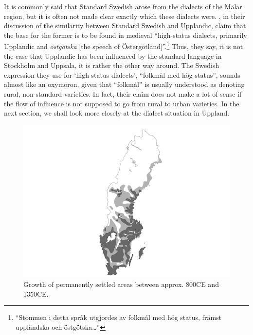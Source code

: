 It is commonly said that Standard Swedish arose from the dialects of the Mälar region, but it is often not made clear exactly which these dialects were. \citet[67]{KällskogEtAl1993}, in their discussion of the similarity between Standard Swedish and Upplandic, claim that the base for the former is to be found in medieval “high-status dialects, primarily Upplandic and \textit{östgötska} [the speech of Östergötland]”.\footnote{ “Stommen i detta språk utgjordes av folkmål med hög status, främst uppländska och östgötska…”} Thus, they say, it is not the case that Upplandic has been influenced by the standard language in Stockholm and Uppsala, it is rather the other way around. The Swedish expression they use for ‘high-status dialects’, “folkmål med hög status”, sounds almost like an oxymoron, given that “folkmål” is usually understood as denoting rural, non-standard varieties. In fact, their claim does not make a lot of sense if the flow of influence is not supposed to go from rural to urban varieties. In the next section, we shall look more closely at the dialect situation in Uppland.

\begin{figure}[h]
\includegraphics[height=.5\textheight]{figures/40_GrowthofPermSettled}
\caption{Growth of permanently settled areas between approx. 800CE and 1350CE. }
\label{map:36}
\end{figure}

